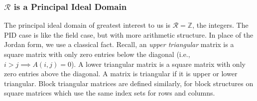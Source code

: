 \documentclass{amsart}
\theoremstyle{definition}
\theoremstyle{definition}
\newcommand{\Z}{\mathbb Z}
\numberwithin{equation}{subsection}
\begin{document}
\subsubsection{$\mathcal R$ is a Principal Ideal Domain}
The principal ideal domain of greatest interest to us is
$\mathcal R = \Z$, the integers.
 The PID  case  is like  the field case, but with
     more arithmetic structure. In place of the Jordan form, we use
     a  classical fact. Recall, an {\it upper triangular} matrix
     is a square matrix with only zero entries below the diagonal
     (i.e., $i > j \implies A(i,j) = 0$). A lower triangular
     matrix is a square matrix with only zero entries above the diagonal.
     A  matrix is triangular if it is upper or lower triangular.
Block triangular matrices are defined similarly,
for block structures on square matrices which use the same
index sets for rows and columns.
\end{document}
